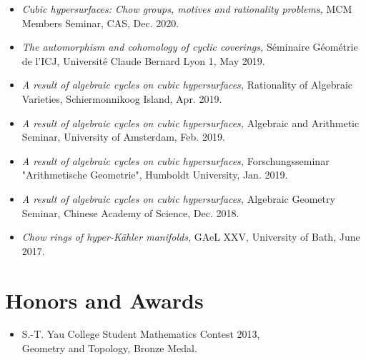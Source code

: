 \documentclass[letterpaper]{article}
\begin{document}
\begin{itemize}
  \item \textit{Cubic hypersurfaces: Chow groups, motives and rationality problems,}
  MCM Members Seminar, CAS, Dec. 2020.

  \item \textit{The automorphism and cohomology of cyclic coverings,}
  S\'eminaire G\'eom\'etrie de l'ICJ, Universit\'e Claude Bernard Lyon 1, May 2019.

  \item \textit{A result of algebraic cycles on cubic hypersurfaces,}
  Rationality of Algebraic Varieties, Schiermonnikoog Island, Apr. 2019.

  \item \textit{A result of algebraic cycles on cubic hypersurfaces,}
  Algebraic and Arithmetic Seminar, University of Amsterdam, Feb. 2019.

  \item \textit{A result of algebraic cycles on cubic hypersurfaces,}
  Forschungsseminar "Arithmetische Geometrie", Humboldt University, Jan. 2019.

  \item \textit{A result of algebraic cycles on cubic hypersurfaces,}
  Algebraic Geometry Seminar, Chinese Academy of Science, Dec. 2018.

  \item\textit{Chow rings of hyper-K\"ahler manifolds,}
  GAeL XXV, University of Bath, June 2017.

\end{itemize}


\section*{Honors and Awards}

\begin{itemize}
\item S.-T. Yau College Student Mathematics Contest 2013,\\
         Geometry and Topology, Bronze Medal.
\end{itemize}


\newpage
\end{document}
